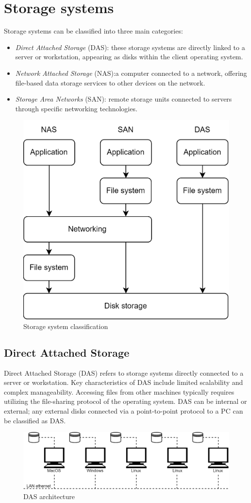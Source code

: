\section{Storage systems}

Storage systems can be classified into three main categories:
\begin{itemize}
    \item \textit{Direct Attached Storage} (DAS): these storage systems are directly linked to a server or workstation, appearing as disks within the client operating system.
    \item \textit{Network Attached Storage} (NAS):a computer connected to a network, offering file-based data storage services to other devices on the network.
    \item \textit{Storage Area Networks} (SAN): remote storage units connected to servers through specific networking technologies.
\end{itemize}
\begin{figure}[H]
    \centering
    \includegraphics[width=0.6\linewidth]{images/ssc.png}
    \caption{Storage system classification}
\end{figure}

\subsection{Direct Attached Storage}
Direct Attached Storage (DAS) refers to storage systems directly connected to a server or workstation. 
Key characteristics of DAS include limited scalability and complex manageability. 
Accessing files from other machines typically requires utilizing the file-sharing protocol of the operating system. 
DAS can be internal or external; any external disks connected via a point-to-point protocol to a PC can be classified as DAS.
\begin{figure}[H]
    \centering
    \includegraphics[width=0.75\linewidth]{images/das.png}
    \caption{DAS architecture}
\end{figure}

